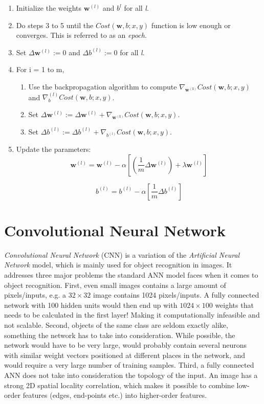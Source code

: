 \begin{enumerate}
	\item Initialize the weights $ \mathbf{w}^{(l)} $ and $ b^{l} $ for all \textit{l}.
	\item Do steps 3 to 5 until the $ Cost(\mathbf{w}, b; x, y) $ function is low enough or converges. This is referred to as an \textit{epoch}. 
	\item Set $ \Delta\mathbf{w}^{(l)} := 0 $ and $ \Delta b^{(l)} := 0 $ for all \textit{l}.
	\item For i = 1 to m,
		\begin{enumerate}
			\item Use the backpropagation algorithm to compute $ \nabla_\mathbf{w^{(l)}}Cost(\mathbf{w}, b;x,y) $ and $ \nabla_b^{(l)}Cost(\mathbf{w}, b;x,y) $.
			\item  Set $ \Delta\mathbf{w}^{(l)} := \Delta\mathbf{w}^{(l)} + \nabla_\mathbf{w^{(l)}}Cost(\mathbf{w}, b;x,y) $. 
			\item  Set $ \Delta b^{(l)} := \Delta b^{(l)} + \nabla_{b^{(l)}}Cost(\mathbf{w}, b;x,y) $. 
		\end{enumerate}
	\item Update the parameters:
		\begin{equation*}
			\mathbf{w}^{(l)} = \mathbf{w}^{(l)} - \alpha[(\frac{1}{m}\Delta\mathbf{w}^{(l)}) + \lambda\mathbf{w}^{(l)}]
		\end{equation*}
		
		\begin{equation*}
			b^{(l)} = b^{(l)} - \alpha[\frac{1}{m}\Delta b^{(l)}]
		\end{equation*}
\end{enumerate}



\section{Convolutional Neural Network}\label{cnn}

\textit{Convolutional Neural Network}\cite{LeCun1998} (CNN) is a variation of the \textit{Artificial Neural Network} model, which is mainly used for object recognition in images. It addresses three major problems the standard ANN model faces when it comes to object recognition. First, even small images contains a large amount of pixels/inputs, e.g. a $ 32 \times 32 $ image contains 1024 pixels/inputs. A fully connected network with 100 hidden units would then end up with $ 1024 \times 100 $ weights that needs to be calculated in the first layer! Making it computationally infeasible and not scalable. Second, objects of the same class are seldom exactly alike, something the network has to take into consideration. While possible, the network would have to be very large, would probably contain several neurons with similar weight vectors positioned at different places in the network, and would require a very large number of training samples. Third, a fully connected ANN does not take into consideration the topology of the input. An image has a strong 2D spatial locality correlation, which makes it possible to combine low-order features (edges, end-points etc.) into higher-order features.  


